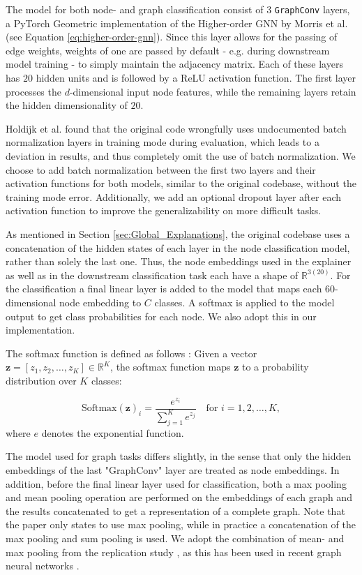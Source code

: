 The model for both node- and graph classification consist of $3$ \lstinline|GraphConv| layers, a PyTorch Geometric implementation of the Higher-order GNN by Morris et al. \cite{morris2019weisfeiler} (see Equation \ref{eq:higher-order-gnn}). Since this layer allows for the passing of edge weights, weights of one are passed by default - e.g. during downstream model training - to simply maintain the adjacency matrix. Each of these layers has $20$ hidden units and is followed by a ReLU activation function. The first layer processes the $d$-dimensional input node features, while the remaining layers retain the hidden dimensionality of $20$.

Holdijk et al. \cite{holdijk2021re} found that the original code wrongfully uses undocumented batch normalization layers in training mode during evaluation, which leads to a deviation in results, and thus completely omit the use of batch normalization. We choose to add batch normalization between the first two layers and their activation functions for both models, similar to the original codebase, without the training mode error. Additionally, we add an optional dropout layer after each activation function to improve the generalizability on more difficult tasks. \bigskip

As mentioned in Section \ref{sec:Global_Explanations}, the original codebase uses a concatenation of the hidden states of each layer in the node classification model, rather than solely the last one. Thus, the node embeddings used in the explainer as well as in the downstream classification task each have a shape of $\mathbb{R}^{3(20)}$. For the classification a final linear layer is added to the model that maps each $60$-dimensional node embedding to $C$ classes. A softmax is applied to the model output to get class probabilities for each node. We also adopt this in our implementation.

The softmax function is defined as follows \cite{Goodfellow-et-al-2016}:
Given a vector \( \mathbf{z} = [z_1, z_2, \dots, z_K] \in \mathbb{R}^K \), the softmax function maps \( \mathbf{z} \) to a probability distribution over \( K \) classes:

\begin{equation}
    \text{Softmax}(\mathbf{z})_i = \frac{e^{z_i}}{\sum_{j=1}^{K} e^{z_j}} \quad \text{for } i = 1, 2, \dots, K,
\end{equation}
where $e$ denotes the exponential function. \bigskip

The model used for graph tasks differs slightly, in the sense that only the hidden embeddings of the last "GraphConv" layer are treated as node embeddings. In addition, before the final linear layer used for classification, both a max pooling and mean pooling operation are performed on the embeddings of each graph and the results concatenated to get a representation of a complete graph. Note that the paper only states to use max pooling, while in practice a concatenation of the max pooling and sum pooling is used. We adopt the combination of mean- and max pooling from the replication study \cite{holdijk2021re}, as this has been used in recent graph neural networks \cite{simonovsky2017dynamic} \cite{ma2021unsupervised} \cite{zhao2023faithful}. 

